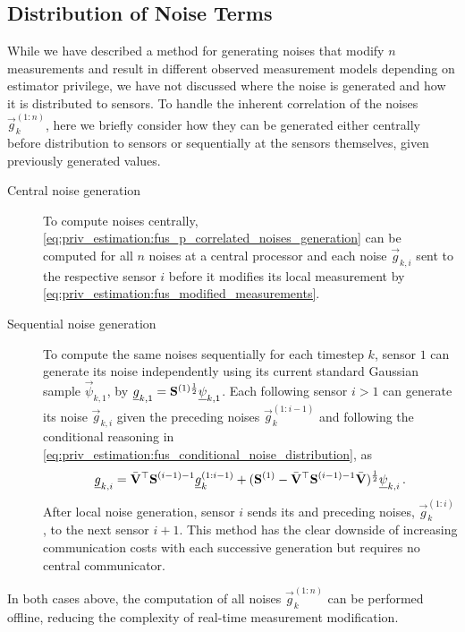 % 
% 

\subsection{Distribution of Noise Terms}\label{subsec:priv_estimation:fus_noise_dist}
While we have described a method for generating noises that modify $n$ measurements and result in different observed measurement models depending on estimator privilege, we have not discussed where the noise is generated and how it is distributed to sensors. To handle the inherent correlation of the noises $\vec{g}_{k}^{(1:n)}$, here we briefly consider how they can be generated either centrally before distribution to sensors or sequentially at the sensors themselves, given previously generated values.
\begin{description}
    \item[Central noise generation] To compute noises centrally, \eqref{eq:priv_estimation:fus_p_correlated_noises_generation} can be computed for all $n$ noises at a central processor and each noise $\vec{g}_{k,i}$ sent to the respective sensor $i$ before it modifies its local measurement by \eqref{eq:priv_estimation:fus_modified_measurements}.
    \item[Sequential noise generation] To compute the same noises sequentially for each timestep $k$, sensor $1$ can generate its noise independently using its current standard Gaussian sample $\vec{\psi}_{k,1}$, by ${\underline{g}}_{k,1} = {{\mathbf{S}}}^{(1)\frac{1}{2}}{\underline{\psi}}_{k,1}$. Each following sensor $i>1$ can generate its noise $\vec{g}_{k,i}$ given the preceding noises $\vec{g}_k^{(1:i-1)}$ and following the conditional reasoning in \eqref{eq:priv_estimation:fus_conditional_noise_distribution}, as
    \begin{equation}
        {\underline{g}}_{k,i} = \bar{{{\mathbf{V}}}}^\top{\ensuremath{{\mathbf{S}}}}^{(i-1)-1}{\underline{g}}_k^{(1:i-1)} +
        ({{\mathbf{S}}}^{(1)}-\bar{{{\mathbf{V}}}}^\top{\ensuremath{{\mathbf{S}}}}^{(i-1)-1}\bar{{{\mathbf{V}}}})^\frac{1}{2}{\underline{\psi}}_{k,i}\,.
    \end{equation}
    After local noise generation, sensor $i$ sends its and preceding noises, $\vec{g}_k^{(1:i)}$, to the next sensor $i+1$. This method has the clear downside of increasing communication costs with each successive generation but requires no central communicator.
\end{description}
In both cases above, the computation of all noises $\vec{g}_k^{(1:n)}$ can be performed offline, reducing the complexity of real-time measurement modification.

